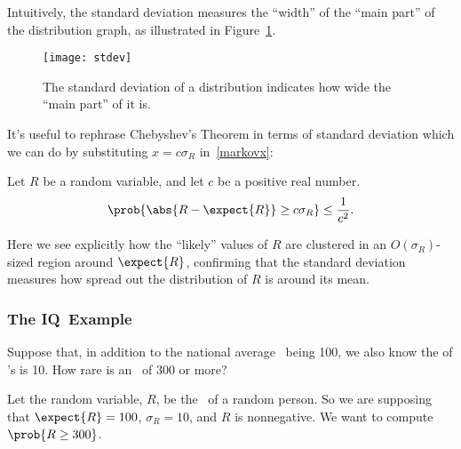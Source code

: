 Intuitively, the standard deviation measures the ``width'' of the ``main
part'' of the distribution graph, as illustrated in
Figure~\ref{fig:stdev}.
\begin{figure}
  \centerline{\texttt{[image: stdev]}}
  \caption{The standard deviation of a distribution indicates how wide the
    ``main part'' of it is.}
  \label{fig:stdev}
\end{figure}

It's useful to rephrase Chebyshev's Theorem in terms of standard
deviation which we can do by substituting $x = c \sigma_R$
in~\eqref{markovx}:
\begin{corollary}\label{cor:cheby}
Let $R$ be a random variable, and let $c$ be a positive real number.
\begin{equation}\label{markovcexp}
\prob{\abs{R - \expect{R}} \geq c \sigma_R} \leq \frac{1}{c^2}.
\end{equation}
\end{corollary}
Here we see explicitly how the ``likely'' values of $R$ are clustered in
an $O(\sigma_R)$-sized region around $\expect{R}$, confirming that the
standard deviation measures how spread out the distribution of $R$ is
around its mean.

\iffalse
\begin{proof}
  Substituting $x = c \sigma_R$ in~\eqref{markovx} gives:
  \begin{displaymath}
    \prob{\card{R - \expect{R}} \geq c \sigma_R}
    \leq
    \frac{\variance{R}}{(c \sigma_R)^2}
    =  \frac{\sigma_R^2}{(c \sigma_R)^2}
    = \frac{1}{c^2}.
  \end{displaymath}



\end{proof}

\fi

\subsubsection{The IQ\ Example}\label{IQsec}

Suppose that, in addition to the national average \idx{\IQ}\ being 100, we
also know the  of \IQ's is 10.  How rare is an
\IQ\ of 300 or more?

Let the random variable, $R$, be the \IQ\ of a random person.  So we are
supposing that $\expect{R} = 100$, $\sigma_R = 10$, and $R$ is
nonnegative.  We want to compute $\prob{R \geq 300}$.

